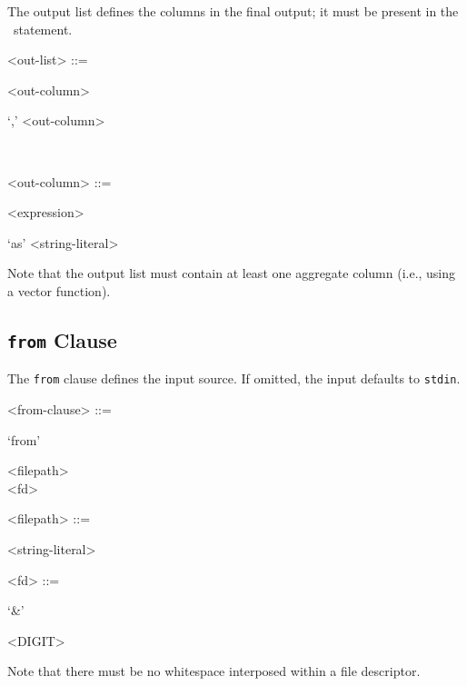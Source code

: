The output list defines the columns in the final output; it must be
present in the \stag\ statement.

\begin{grammar}
  <out-list> ::= \begin{syntdiag}
    <out-column>
    \begin{stack}
      \begin{rep}`,' <out-column>\end{rep} \\
    \end{stack}
  \end{syntdiag}

  <out-column> ::= \begin{syntdiag}
    <expression>
    \begin{stack}
      `as' <string-literal> \\
    \end{stack}
  \end{syntdiag}
\end{grammar}

Note that the output list must contain at least one aggregate column
(i.e., using a vector function).

\subsection{\texttt{from} Clause}

The \texttt{from} clause defines the input source. If omitted, the input
defaults to \texttt{stdin}.

\begin{grammar}
  <from-clause> ::= \begin{syntdiag}
    `from'
    \begin{stack}
      <filepath> \\
      <fd>
    \end{stack}
  \end{syntdiag}

  <filepath> ::= \begin{syntdiag}
    <string-literal>
  \end{syntdiag}

  <fd> ::= \begin{syntdiag}
    `\&'
    \begin{rep}
      <DIGIT>
    \end{rep}
  \end{syntdiag}
\end{grammar}

Note that there must be no whitespace interposed within a file
descriptor.

